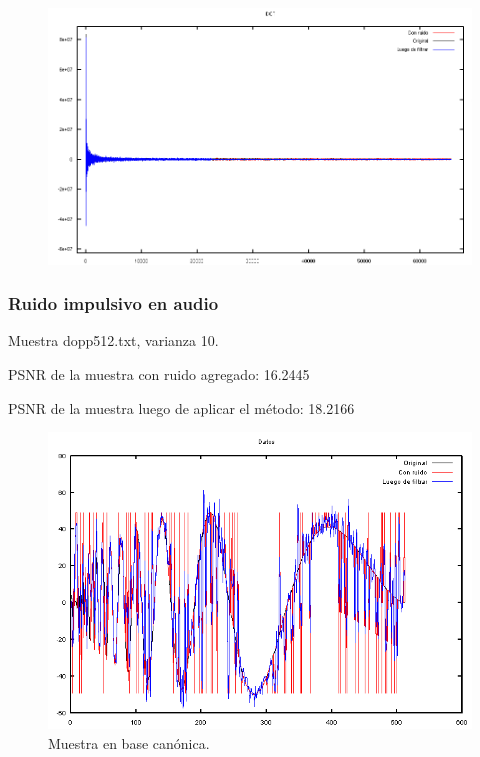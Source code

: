 \documentclass[a4paper,10pt,twoside]{article}
\begin{document}
\begin{figure}[H]
  \centering
  \includegraphics[width=15cm]{graficos/lena_aditivo_atenuar_dct.png} 
\end{figure}


\subsubsection{Ruido impulsivo en audio}

Muestra dopp512.txt, varianza 10.

PSNR de la muestra con ruido agregado: 16.2445

PSNR de la muestra luego de aplicar el método: 18.2166

\begin{figure}[H]
  \centering
  \includegraphics[width=15cm]{graficos/dopp_impulsivo_atenuar_muestra.png} 
  \caption{Muestra en base canónica.}
\end{figure}
\end{document}
